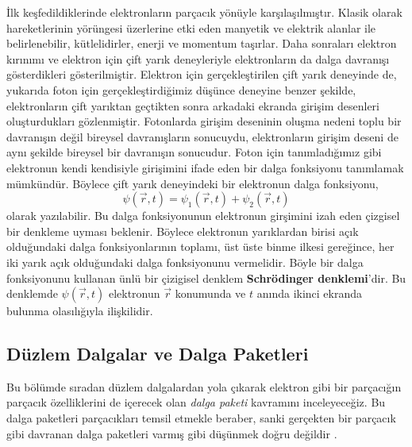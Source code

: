 \documentclass[00_kitap.tex]{subfiles}
\begin{document}
İlk keşfedildiklerinde elektronların parçacık yönüyle karşılaşılmıştır. Klasik olarak hareketlerinin yörüngesi üzerlerine etki eden manyetik ve elektrik alanlar ile belirlenebilir, kütlelidirler, enerji ve momentum taşırlar. Daha sonraları elektron kırınımı ve elektron için çift yarık deneyleriyle elektronların da dalga davranışı gösterdikleri gösterilmiştir. Elektron için gerçekleştirilen çift yarık deneyinde de, yukarıda foton için gerçekleştirdiğimiz düşünce deneyine benzer şekilde, elektronların çift yarıktan geçtikten sonra arkadaki ekranda girişim desenleri oluşturdukları gözlenmiştir. Fotonlarda girişim deseninin oluşma nedeni toplu bir davranışın değil bireysel davranışların sonucuydu, elektronların girişim deseni de aynı şekilde bireysel bir davranışın sonucudur. Foton için tanımladığımız gibi elektronun kendi kendisiyle girişimini ifade eden bir dalga fonksiyonu tanımlamak mümkündür. Böylece çift yarık deneyindeki bir elektronun dalga fonksiyonu,
\begin{equation}
\psi(\vec r, t) = \psi_1(\vec r, t) + \psi_2(\vec r, t)
\label{eq:single_electron_wave}
\end{equation}
olarak yazılabilir. Bu dalga fonksiyonunun elektronun girşimini izah eden çizgisel bir denkleme uyması beklenir. Böylece elektronun yarıklardan birisi açık olduğundaki dalga fonksiyonlarının toplamı, üst üste binme ilkesi gereğince, her iki yarık açık olduğundaki dalga fonksiyonunu vermelidir. Böyle bir dalga fonksiyonunu kullanan ünlü bir çizigisel denklem {\bf Schrödinger denklemi}'dir. Bu denklemde $\psi (\vec r, t)$ elektronun $\vec r$ konumunda ve $t$ anında ikinci ekranda bulunma olasılığıyla ilişkilidir. 

\subsection{Düzlem Dalgalar ve Dalga Paketleri}

Bu bölümde sıradan düzlem dalgalardan yola çıkarak elektron gibi bir parçacığın parçacık özelliklerini de içerecek olan \emph{dalga paketi} kavramını inceleyeceğiz. Bu dalga paketleri parçacıkları temsil etmekle beraber, sanki gerçekten bir parçacık gibi davranan dalga paketleri varmış gibi düşünmek doğru değildir \cite{book:Gasiorowicz}.
\end{document}

